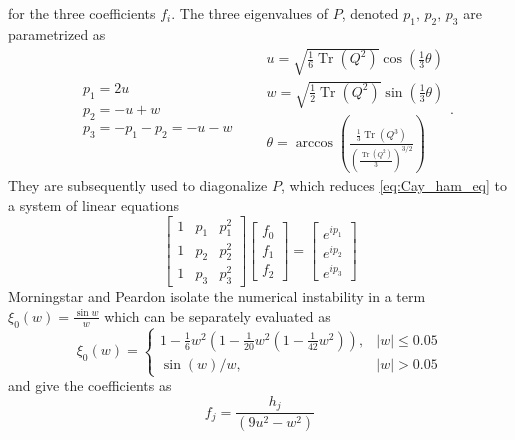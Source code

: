 \documentclass[a4paper,10pt]{article}
\begin{document}
for the three coefficients $f_i$. The three eigenvalues of $P$, denoted $p_1,\,p_2,\,p_3$ are parametrized as 
\begin{equation}
\begin{aligned}
&p_{1}=2 u \\
&p_{2}=-u+w\\
&p_{3}=-p_{1}-p_{2}=-u-w
\end{aligned}
\,\,\,\,\,
\begin{aligned}
&u=\sqrt{\frac{1}{6}\operatorname{Tr}\left(Q^{2}\right)} \cos \left(\frac{1}{3} \theta\right) \\
&w=\sqrt{\frac{1}{2} \operatorname{Tr}\left(Q^{2}\right)} \sin \left(\frac{1}{3} \theta\right) \\
&\theta=\arccos \left(\frac{\frac{1}{3} \operatorname{Tr}\left(Q^{3}\right)}{\left(\frac{ \operatorname{Tr}\left(Q^{2}\right)}{3}\right)^{3 / 2}}\right)
\end{aligned}.
\end{equation}
They are subsequently used to diagonalize $P$, which reduces \eqref{eq:Cay_ham_eq} to a system of linear equations
\begin{equation}
\left[\begin{array}{lll}
1 & p_{1} & p_{1}^{2} \\
1 & p_{2} & p_{2}^{2} \\
1 & p_{3} & p_{3}^{2}
\end{array}\right]\left[\begin{array}{l}
f_{0} \\
f_{1} \\
f_{2}
\end{array}\right]=\left[\begin{array}{c}
e^{i p_{1}} \\
e^{i p_{2}} \\
e^{i p_{3}}
\end{array}\right]
\end{equation}
Morningstar and Peardon isolate the numerical instability in a term $\xi_{0}(w)=\frac{\sin w}{w}$ which can be separately evaluated as 
\begin{equation}
\xi_{0}(w)= \begin{cases}1-\frac{1}{6} w^{2}\left(1-\frac{1}{20} w^{2}\left(1-\frac{1}{42} w^{2}\right)\right), & |w| \leqslant 0.05 \\ \sin (w) / w, & |w|>0.05\end{cases}
\end{equation}
and give the coefficients as 
\begin{equation}\label{eq:f_coeffs_equation}
f_{j}=\frac{h_{j}}{\left(9 u^{2}-w^{2}\right)}
\end{equation}
\end{document}
